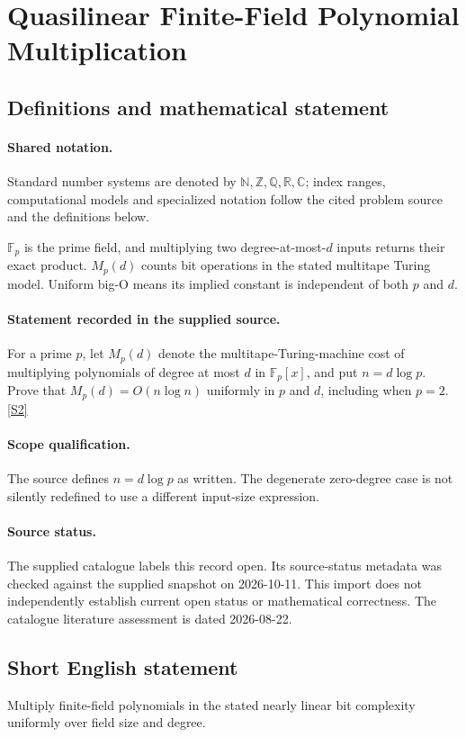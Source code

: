 \documentclass[11pt]{article}
\newcommand{\sref}[2]{\hyperlink{source:#1:#2}{[S#2]}}
\begin{document}
\section{Quasilinear Finite-Field Polynomial Multiplication}\label{statement}

\subsection{Definitions and mathematical statement}

\paragraph{Shared notation.}Standard number systems are denoted by $\mathbb N,\mathbb Z,\mathbb Q,\mathbb R,\mathbb C$; index ranges, computational models and specialized notation follow the cited problem source and the definitions below.


$\mathbb F_p$ is the prime field, and multiplying two degree-at-most-$d$ inputs returns their exact product. $M_p(d)$ counts bit operations in the stated multitape Turing model. Uniform big-O means its implied constant is independent of both $p$ and $d$.
\paragraph{Statement recorded in the supplied source.}
For a prime $p$, let $M_p(d)$ denote the multitape-Turing-machine cost of multiplying polynomials of degree at most $d$ in $\mathbb{F}_p[x]$, and put $n=d\log p$. Prove that $M_p(d)=O(n\log n)$ uniformly in $p$ and $d$, including when $p=2$. \sref{statement}{2}
\paragraph{Scope qualification.}
The source defines $n=d\log p$ as written. The degenerate zero-degree case is not silently redefined to use a different input-size expression.
\paragraph{Source status.}
The supplied catalogue labels this record open. Its source-status metadata was checked against the supplied snapshot on 2026-10-11. This import does not independently establish current open status or mathematical correctness. The catalogue literature assessment is dated 2026-08-22.
\subsection{Short English statement}
Multiply finite-field polynomials in the stated nearly linear bit complexity uniformly over field size and degree.
\end{document}
